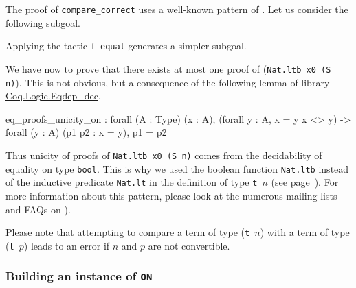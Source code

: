 



\begin{remark}
 The proof of \texttt{compare\_correct} uses a well-known pattern of \coq{}.
Let us consider  the following subgoal.
 



Applying the tactic \texttt{f\_equal} generates a simpler subgoal.




We have now to prove that there exists at most one  proof of (\texttt{Nat.ltb x0 (S n)}). This is not obvious, but  a consequence of the following lemma of library 
\href{https://coq.inria.fr/distrib/current/stdlib/Coq.Logic.Eqdep_dec.html}{Coq.Logic.Eqdep\_dec}.

\label{sect:eq-proof-unicity}

\begin{Coqanswer}
eq_proofs_unicity_on :
forall (A : Type) (x : A),
(forall y : A, x = y \/ x <> y) -> 
forall (y : A) (p1 p2 : x = y), p1 = p2
\end{Coqanswer}

Thus unicity of proofs of \texttt{Nat.ltb x0 (S n)}  comes from the decidability of
equality on type \texttt{bool}.
This is why we used the boolean function \texttt{Nat.ltb} instead of the inductive predicate \texttt{Nat.lt} in the definition of type \texttt{t $n$} (see page~\pageref{def: Finite-ord-type}).
For more information about this pattern, please look at the numerous mailing lists and 
FAQs on \coq{}).


\end{remark}

\begin{remark}
  
Please note  that attempting to compare a term  of type (\texttt{t $n$}) with a term of
type (\texttt{t $p$})  leads to an error if $n$ and $p$ are not convertible.





\end{remark}

\subsubsection{Building an instance of \texttt{ON}}


